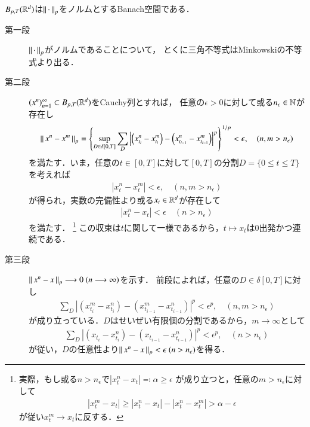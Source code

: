 \begin{screen}
	\begin{thm}
		$B_{p,T}(\mathbb{R}^d)$は$\left\|\, \cdot\, \right\|_{p}$をノルムとするBanach空間である．
	\end{thm}
\end{screen}

\begin{prf}\mbox{}
	\begin{description}
		\item[第一段]
			$\left\|\, \cdot\, \right\|_{p}$がノルムであることについて，
			とくに三角不等式はMinkowskiの不等式より出る．
			
		\item[第二段] $(x^n)_{n=1}^{\infty} \subset B_{p,T}(\mathbb{R}^d)$をCauchy列とすれば，
			任意の$\epsilon > 0$に対して或る$n_\epsilon \in \mathbb{N}$が存在し
			\begin{align}
				\left\|\, x^n - x^m\, \right\|_{p}
				= \left\{ \operatorname*{sup}_{D \in \delta[0,T]} \sum_{D} 
				\left| \left( x^n_{t_i} - x^m_{t_i} \right) 
				- \left(x^n_{t_{i-1}} - x^m_{t_{i-1}} \right) \right|^p \right\}^{1/p} < \epsilon,
				\quad (n,m > n_\epsilon)
			\end{align}
			を満たす．いま，任意の$t \in [0,T]$に対して$[0,T]$の分割$D = \{0 \leq t \leq T\}$
			を考えれば
			\begin{align}
				|x^n_t - x^m_t| < \epsilon,
				\quad (n,m > n_\epsilon)
			\end{align}
			が得られ，実数の完備性より或る$x_t \in \mathbb{R}^d$が存在して
			\begin{align}
				|x^n_t - x_t| < \epsilon
				\quad (n > n_\epsilon)
			\end{align}
			を満たす．
			\footnote{
				実際，もし或る$n > n_\epsilon$で$|x^n_t - x_t| \eqqcolon \alpha \geq \epsilon$
				が成り立つと，任意の$m > n_\epsilon$に対して
				\begin{align}
					|x^m_t - x_t| \geq |x^n_t - x_t| - |x^n_t - x^m_t| > \alpha - \epsilon
				\end{align}
				が従い$x^m_t \longrightarrow x_t$に反する．
			}
			この収束は$t$に関して一様であるから，$t \longmapsto x_t$は0出発かつ連続である．
			
		\item[第三段] $\left\|\, x^n - x\, \right\|_{p} \longrightarrow 0\ (n \longrightarrow \infty)$を示す．
			前段によれば，任意の$D \in \delta[0,T]$に対し
			\begin{align}
				\sum_D \left| (x^m_{t_i} - x^n_{t_i}) - (x^m_{t_{i-1}} - x^n_{t_{i-1}}) \right|^p
				< \epsilon^p,
				\quad (n,m > n_\epsilon)
			\end{align}
			が成り立っている．$D$はせいぜい有限個の分割であるから，$m \longrightarrow \infty$として
			\begin{align}
				\sum_D \left| (x_{t_i} - x^n_{t_i}) - (x_{t_{i-1}} - x^n_{t_{i-1}}) \right|^p
				< \epsilon^p,
				\quad (n > n_\epsilon)
			\end{align}
			が従い，$D$の任意性より$\left\|\, x^n - x\, \right\|_{p} < \epsilon\ (n > n_\epsilon)$を得る．
			\QED
	\end{description}
\end{prf}

